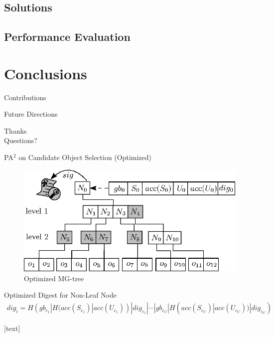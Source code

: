 \documentclass[xcolor={dvipsnames},aspectratio=169,10pt]{beamer}
\begin{document}
\subsection{Solutions}

\subsection{Performance Evaluation}

\section{Conclusions}

\begin{frame}{Contributions}
\end{frame}

\begin{frame}{Future Directions}
\end{frame}

\begin{frame}[standout]
  Thanks \\
  Questions?
\end{frame}

\appendix%

\begin{frame}{PA$^2$ on Candidate Object Selection (Optimized)}
  \begin{figure}
    \includegraphics[width=.4\linewidth]{figs/aggregate-queries/grid_tree_opt.eps}
    \caption{Optimized MG-tree}
  \end{figure}
  \begin{alertblock}{Optimized Digest for Non-Leaf Node}
    \begin{align*}
      dig_i = H(gb_{c_1} | H(acc(S_{c_1})| acc(U_{c_1})) | dig_{c_1} | \dotsb
      |gb_{c_C} | H(acc(S_{c_C})|acc(U_{c_C})) | dig_{c_C})
    \end{align*}
  \end{alertblock}
\end{frame}


\begingroup
{}
\begin{frame}[t,allowframebreaks]{\refname}
  [text]
  \renewcommand*{\bibfont}{\scriptsize}
  \printbibliography[heading=none]%
\end{frame}
\endgroup
\end{document}
